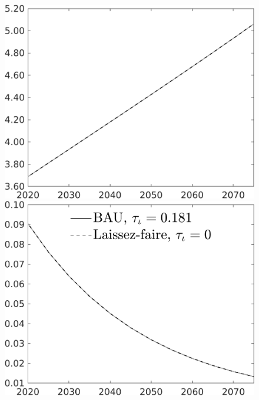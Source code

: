 \documentclass[12pt]{article}
\begin{document}
\begin{figure}[h!!]
\begin{minipage}[]{0.32\textwidth}
	\end{minipage}	
	\begin{minipage}[]{0.32\textwidth}
		\includegraphics[width=1\textwidth]{../../codding_model/own_basedOnFried/optimalPol_010922_revision/figures/all_13Sept22/CompTaul_LFBAU_Reg0_wh_spillover0_nsk1_xgr1_knspil1_sep1_countec0_GovRev0_etaa0.79_lgd0.png}
	\end{minipage}	
	\begin{minipage}[]{0.32\textwidth}
		\includegraphics[width=1\textwidth]{../../codding_model/own_basedOnFried/optimalPol_010922_revision/figures/all_13Sept22/CompTaul_LFBAU_Reg0_GFF_spillover0_nsk1_xgr1_knspil1_sep1_countec0_GovRev0_etaa0.79_lgd1.png}

\end{minipage}
\end{figure}
\end{document}

